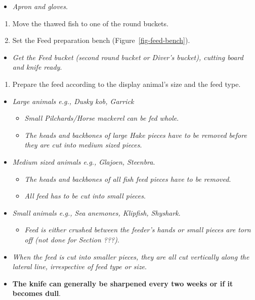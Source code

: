 \documentclass[
  12pt,
]{report}
\providecommand{\tightlist}{%
  \setlength{\itemsep}{0pt}\setlength{\parskip}{0pt}}\usepackage{longtable,booktabs,array}
\begin{document}
\begin{itemize}
\tightlist
\item
  \emph{Apron and gloves}.
\end{itemize}

\begin{enumerate}
\def\labelenumi{\arabic{enumi}.}
\setcounter{enumi}{5}
\tightlist
\item
  Move the thawed fish to one of the round buckets.
\item
  Set the Feed preparation bench (Figure~\ref{fig-feed-bench}).
\end{enumerate}

\begin{itemize}
\tightlist
\item
  \emph{Get the Feed bucket (second round bucket or Diver's bucket),
  cutting board and knife ready}.
\end{itemize}

\begin{enumerate}
\def\labelenumi{\arabic{enumi}.}
\setcounter{enumi}{7}
\tightlist
\item
  Prepare the feed according to the display animal's size and the feed
  type.
\end{enumerate}

\begin{itemize}
\item
  \emph{Large animals e.g., Dusky kob, Garrick}

  \begin{itemize}
  \tightlist
  \item
    \emph{Small Pilchards/Horse mackerel can be fed whole}.
  \item
    \emph{The heads and backbones of large Hake pieces have to be
    removed before they are cut into medium sized pieces}.
  \end{itemize}
\item
  \emph{Medium sized animals e.g., Glajoen, Steenbra}.

  \begin{itemize}
  \tightlist
  \item
    \emph{The heads and backbones of all fish feed pieces have to be
    removed}.
  \item
    \emph{All feed has to be cut into small pieces}.
  \end{itemize}
\item
  \emph{Small animals e.g., Sea anemones, Klipfish, Shyshark}.

  \begin{itemize}
  \tightlist
  \item
    \emph{Feed is either crushed between the feeder's hands or small
    pieces are torn off (not done for Section ???)}.
  \end{itemize}
\item
  \emph{When the feed is cut into smaller pieces, they are all cut
  vertically along the lateral line, irrespective of feed type or size}.
\item
  \textbf{The knife can generally be sharpened every two weeks or if it
  becomes dull}.
\end{itemize}
\end{document}
